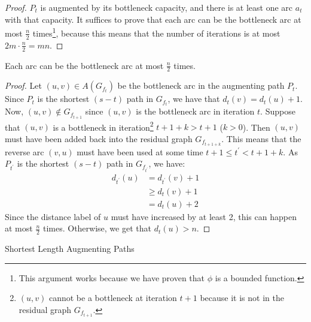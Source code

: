 \begin{proof}
		\noindent $P_t$ is augmented by its bottleneck capacity, and there is at least one arc $a_t$ with that capacity. It suffices to prove that each arc can be the bottleneck arc at most $\frac{n}{2}$ times\footnote{This argument works because we have proven that $\phi$ is a bounded function.}, because this means that the number of iterations is at most $2m \cdot \frac{n}{2} = mn$.
	\end{proof}

	\begin{lem}
		Each arc can be the bottleneck arc at most $\frac{n}{2}$ times.
	\end{lem}

	\begin{proof}
		Let $(u,v) \in A(G_{f_t})$ be the bottleneck arc in the augmenting path $P_t$. Since $P_t$ is the shortest $(s-t)$ path in $G_{f_t}$, we have that $d_t(v) = d_t(u) + 1$. Now, $(u,v) \not\in G_{f_{t+1}}$ since $(u,v)$ is the bottleneck arc in iteration $t$. Suppose that $(u,v)$ is a bottleneck in iteration\footnote{$(u,v)$ cannot be a bottleneck at iteration $t + 1$ because it is not in the residual graph $G_{f_{t+1}}$.} $t + 1 + k > t + 1$ ($k > 0$). Then $(u,v)$ must have been added back into the residual graph $G_{f_{t + 1 + k}}$. This means that the reverse arc $(v,u)$ must have been used at some time $t + 1 \leq t^{\prime} < t + 1 + k$. As $P_{t^{\prime}}$ is the shortest $(s-t)$ path in $G_{f_{t^{\prime}}}$, we have:
		\begin{align*}
			d_{t^{\prime}}(u) &= d_{t^{\prime}}(v) + 1 \\
			&\geq d_t(v) + 1\\
			&= d_t(u) + 2
		\end{align*}
		\noindent Since the distance label of $u$ must have increased by at least 2, this can happen at most $\frac{n}{2}$ times. Otherwise, we get that $d_t(u) > n$.
	\end{proof}

		\begin{algorithm}
	  \caption{Shortest Length Augmenting Paths}\label{greedyaug}
	\end{algorithm}